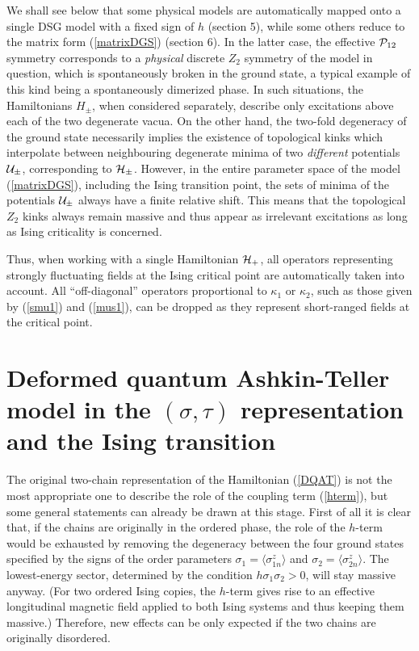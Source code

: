 We shall see below that some physical models are automatically mapped onto
a single DSG model with a fixed sign of $h$ (section 5),
while some others reduce to the matrix form
(\ref{matrixDGS}) (section 6).
In the latter case,
the effective ${\cal{P}}_{12}$ symmetry corresponds to
a {\sl physical} discrete $Z_2$ symmetry of
the model in question, which is spontaneously broken in the ground state,
a typical example of this kind being a spontaneously dimerized phase.
In such situations, the Hamiltonians
$H_{\pm}$, when considered separately, describe only
excitations above each of the two degenerate vacua. On the other hand,
the two-fold degeneracy of the ground state necessarily implies
the existence of topological kinks
which interpolate between neighbouring degenerate minima of
two {\sl different} potentials ${\cal{U}}_{\pm}$, corresponding to
${\cal{H}}_{\pm}$. However,
in the entire parameter space of the model (\ref{matrixDGS}),
including the Ising transition point, the sets of minima of the potentials
${\cal{U}}_{\pm}$ always have a finite relative shift. This means that
the topological $Z_2$ kinks always remain massive and
thus appear as irrelevant excitations as long as Ising criticality
is concerned.

Thus, when working with a single Hamiltonian ${\cal{H}}_+$,
all operators
representing strongly fluctuating fields at the Ising critical point
are automatically taken into account. All ``off-diagonal'' operators
proportional
to $\kappa_1$ or $\kappa_2$, such as those given by (\ref{smu1}) and
(\ref{mus1}),
can be dropped as they represent short-ranged fields
at the critical point.

\section{Deformed quantum Ashkin-Teller  model in the $(\sigma,\tau)$ representation and the Ising transition}
\label{DAT}

The original two-chain representation of the Hamiltonian (\ref{DQAT})
is not the most appropriate one to describe the role of the
coupling term (\ref{hterm}), but some general
statements can already be drawn at this stage. First of all it is
clear that, if the chains are originally in the ordered phase,
the role of the $h$-term would be exhausted by removing the
degeneracy between the four ground states specified by
the signs of the order parameters $\sigma_1 = \langle\sigma^z_{1n}\rangle$
and $\sigma_2 = \langle \sigma^z_{2n}\rangle$. The lowest-energy sector,
determined by the condition $h\sigma_1\sigma_2>0$, will stay massive anyway.
(For two ordered Ising copies, the $h$-term gives rise to an effective
longitudinal magnetic field applied to both Ising systems and
thus keeping them massive.)
Therefore, new effects can be only expected if
the two chains are originally disordered.

